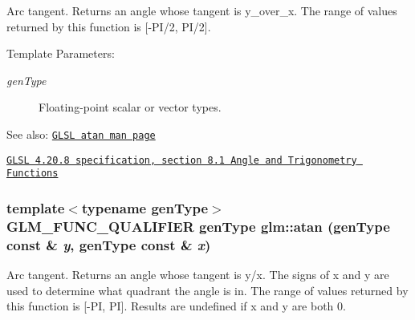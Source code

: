 Arc tangent. Returns an angle whose tangent is y\_\-over\_\-x. The range of values returned by this function is \mbox{[}-PI/2, PI/2\mbox{]}.

\begin{Desc}
\item[Template Parameters:]
\begin{description}
\item[{\em genType}]Floating-point scalar or vector types.\end{description}
\end{Desc}
\begin{Desc}
\item[See also:]\href{http://www.opengl.org/sdk/docs/manglsl/xhtml/atan.xml}{\tt GLSL atan man page} 

\href{http://www.opengl.org/registry/doc/GLSLangSpec.4.20.8.pdf}{\tt GLSL 4.20.8 specification, section 8.1 Angle and Trigonometry Functions} \end{Desc}
\hypertarget{group__core__func__trigonometric_gb89f4e2a1ea1426dc87ab3a06901b68a}{
\subsubsection[atan]{\setlength{\rightskip}{0pt plus 5cm}template$<$typename genType$>$ GLM\_\-FUNC\_\-QUALIFIER genType glm::atan (genType const \& {\em y}, \/  genType const \& {\em x})}}
\label{group__core__func__trigonometric_gb89f4e2a1ea1426dc87ab3a06901b68a}


Arc tangent. Returns an angle whose tangent is y/x. The signs of x and y are used to determine what quadrant the angle is in. The range of values returned by this function is \mbox{[}-PI, PI\mbox{]}. Results are undefined if x and y are both 0.

